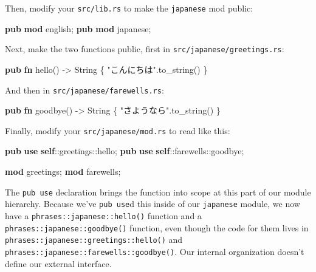 \documentclass[a4paper,]{book}
\newenvironment{Shaded}{\begin{snugshade}}{\end{snugshade}}
\newcommand{\KeywordTok}[1]{\textcolor[rgb]{0.13,0.29,0.53}{\textbf{{#1}}}}
\newcommand{\DataTypeTok}[1]{\textcolor[rgb]{0.13,0.29,0.53}{{#1}}}
\newcommand{\StringTok}[1]{\textcolor[rgb]{0.31,0.60,0.02}{{#1}}}
\newcommand{\NormalTok}[1]{{#1}}
\begin{document}
Then, modify your \texttt{src/lib.rs} to make the \texttt{japanese} mod
public:

\begin{Shaded}
\begin{Highlighting}[]
\KeywordTok{pub} \KeywordTok{mod} \NormalTok{english;}
\KeywordTok{pub} \KeywordTok{mod} \NormalTok{japanese;}
\end{Highlighting}
\end{Shaded}

Next, make the two functions public, first in
\texttt{src/japanese/greetings.rs}:

\begin{Shaded}
\begin{Highlighting}[]
\KeywordTok{pub} \KeywordTok{fn} \NormalTok{hello() -> }\DataTypeTok{String} \NormalTok{\{}
    \StringTok{"こんにちは"}\NormalTok{.to_string()}
\NormalTok{\}}
\end{Highlighting}
\end{Shaded}

And then in \texttt{src/japanese/farewells.rs}:

\begin{Shaded}
\begin{Highlighting}[]
\KeywordTok{pub} \KeywordTok{fn} \NormalTok{goodbye() -> }\DataTypeTok{String} \NormalTok{\{}
    \StringTok{"さようなら"}\NormalTok{.to_string()}
\NormalTok{\}}
\end{Highlighting}
\end{Shaded}

Finally, modify your \texttt{src/japanese/mod.rs} to read like this:

\begin{Shaded}
\begin{Highlighting}[]
\KeywordTok{pub} \KeywordTok{use} \KeywordTok{self}\NormalTok{::greetings::hello;}
\KeywordTok{pub} \KeywordTok{use} \KeywordTok{self}\NormalTok{::farewells::goodbye;}

\KeywordTok{mod} \NormalTok{greetings;}
\KeywordTok{mod} \NormalTok{farewells;}
\end{Highlighting}
\end{Shaded}

The \texttt{pub\ use} declaration brings the function into scope at this
part of our module hierarchy. Because we've \texttt{pub\ use}d this
inside of our \texttt{japanese} module, we now have a
\texttt{phrases::japanese::hello()} function and a
\texttt{phrases::japanese::goodbye()} function, even though the code for
them lives in \texttt{phrases::japanese::greetings::hello()} and
\texttt{phrases::japanese::farewells::goodbye()}. Our internal
organization doesn't define our external interface.
\end{document}
